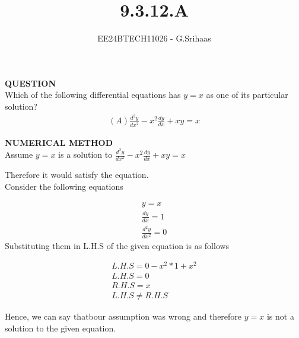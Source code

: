 \documentclass[journal]{IEEEtran}
\begin{document}

\vspace{3cm}

\title{9.3.12.A}
\author{EE24BTECH11026 - G.Srihaas}
{\let\newpage\relax\maketitle}

\renewcommand{\thefigure}{\theenumi}
\renewcommand{\thetable}{\theenumi}
\setlength{\intextsep}{10pt} %


\renewcommand{\thetable}{\theenumi}

\textbf{QUESTION} \\
Which of the following differential equations has $y = x$ as one of its particular
solution?\\
\begin{align}
(A) \frac{d^2y}{dx^2} - x^2\frac{dy}{dx} + xy = x
\end{align}

\solution
\textbf{NUMERICAL METHOD}\\	
 
Assume $y=x$ is a solution to $\frac{d^2y}{dx^2} - x^2\frac{dy}{dx} + xy = x$

 Therefore it would satisfy the equation.\\

 Consider the following equations
 
\begin{align}
y=x\\
\frac{dy}{dx}=1\\
\frac{d^2y}{dx^2}=0
\end{align}
 Substituting them in L.H.S of the given equation is as follows

\begin{align}
L.H.S=0-x^2*1+x^2\\
L.H.S=0\\
R.H.S=x\\ 
L.H.S \neq R.H.S
\end{align}

Hence, we can say thatbour assumption was wrong and therefore $y=x$ is not a solution to the given equation.\\
\end{document}
